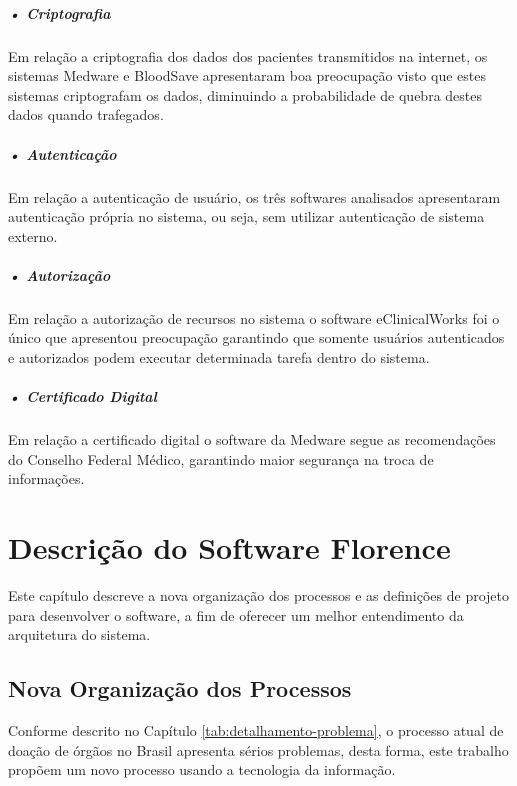 \documentclass[portuguese,oneside]{tcc}
\begin{document}
\paragraph*{• Criptografia}
Em relação a criptografia dos dados dos pacientes transmitidos na internet, os sistemas Medware e BloodSave apresentaram boa preocupação visto que estes sistemas criptografam os dados, diminuindo a probabilidade de quebra destes dados quando trafegados.

\paragraph*{• Autenticação}
Em relação a autenticação de usuário, os três softwares analisados apresentaram autenticação própria no sistema, ou seja, sem utilizar autenticação de sistema externo.

\paragraph*{• Autorização}
Em relação a autorização de recursos no sistema o software eClinicalWorks foi o único que apresentou preocupação garantindo que somente usuários autenticados e autorizados podem executar determinada tarefa dentro do sistema.

\paragraph*{• Certificado Digital}
Em relação a certificado digital o software da Medware segue as recomendações do Conselho Federal Médico, garantindo maior segurança na troca de informações.

\chapter{Descrição do Software Florence} \label{tab:descricao-trabalho}
Este capítulo descreve a nova organização dos processos e as definições de projeto para desenvolver o software, a fim de oferecer um melhor entendimento da arquitetura do sistema.


\section{Nova Organização dos Processos}
Conforme descrito no Capítulo \ref{tab:detalhamento-problema}, o processo atual de doação de órgãos no Brasil apresenta sérios problemas, desta forma, este trabalho propõem um novo processo usando a tecnologia da informação.
\end{document}
